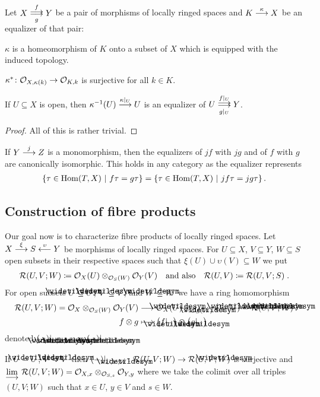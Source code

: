 \documentclass[a4paper,parskip=half,numbers=enddot, DIV=12]{scrreprt}
\begin{document}
\begin{cor}
    Let $X\doublemorphism[f][\smash{g}] Y$ be a pair of morphisms of locally ringed spaces and $K\morphism[\kappa] X$ be an equalizer of that pair:
    \begin{alphanumerate}
      \item 
        $\kappa$ is a homeomorphism of $K$ onto a subset of $X$ which is equipped with the induced topology.
      \item 
        $\kappa^*\colon \Oo_{X,\kappa(k)} \morphism \Oo_{K,k}$ is surjective for all $k\in K$.
      \item 
        If $U\subseteq X$ is open, then $\kappa^{-1} (U) \morphism[\kappa|_U] U$ is an equalizer of $U \doublemorphism[f|_U][g|_U] Y$.
    \end{alphanumerate}
\end{cor}
\begin{proof}
	All of this is rather trivial.
\end{proof}
\begin{rem*}
    If $Y\morphism[j] Z$ is a monomorphism, then the equalizers of $jf$ with $jg$ and of $f$ with $g$ are canonically isomorphic. This holds in any category as the equalizer represents
    \begin{align*}
        \left\{\tau \in \operatorname{Hom}(T,X) \ \middle|\   f\tau =  g\tau \right\} = \left\{\tau \in \operatorname{Hom}(T,X) \ \middle|\  jf\tau = jg\tau\right\}.
    \end{align*}
\end{rem*}
\subsection{Construction of fibre products}
Our goal now is to characterize fibre products of locally ringed spaces. Let $X\morphism[\xi]S\lmorphism[\upsilon]Y$ be morphisms of locally ringed spaces.  For $U\subseteq X$, $V\subseteq Y$, $W\subseteq S$ open subsets in their respective spaces such that $\xi(U) \cup \upsilon(V)\subseteq W$ we put 
\begin{align*}
	\mathcal{R}(U,V;W) \coloneqq \mathcal{O}_X(U)\otimes_{\mathcal{O}_S(W)}\mathcal{O}_Y(V)\quad\text{and also}\quad \mathcal{R}(U,V) \coloneqq  \mathcal{R}(U,V;S)\;. 
\end{align*}
For open subsets $\snake{U}\subseteq U$, $\snake{V}\subseteq V$, and  $\snake{W}\subseteq W$ we have a ring homomorphism
\begin{align*}
	\Rr(U,V;W)=\Oo_X\otimes_{\Oo_S(W)}\Oo_Y(V)&\morphism\Oo_X(\snake{U})\otimes_{\Oo_S(\snake{W})}\Oo_Y(\snake{V})=\Rr(\snake{U},\snake{V};\snake{W})\\
	f\otimes g&\longmapsto \big(f|_{\snake{U}}\big)\otimes\big(g|_{\snake{V}}\big)
\end{align*}
denoted $(-)|_{\snake{U},\snake{V};\snake{W}}$ or $(-)|_{\snake{U},\snake{V}}$.
\begin{rem*}
	If $U=\snake U$, $V= \snake V$ then $(-)|_{U,V;\snake W}\colon\Rr(U,V;W)\morphism \Rr(U,V;\snake{W})$ is surjective and $\colimit \Rr(U,V;W) = \Oo_{X,x}\otimes_{\Oo_{S,s}} \Oo_{Y,y}$ where we take the colimit over all triples $(U,V;W)$ such that $x\in U$, $y\in V$ and $s\in W$.
\end{rem*}
\end{document}
